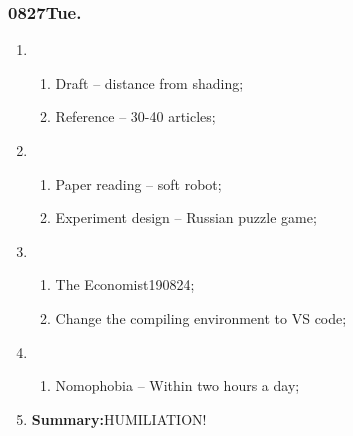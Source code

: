 \subsubsection{0827Tue.}
\begin{enumerate}
	\item \ncquaone
	\begin{enumerate}[(1)]
		\item Draft -- distance from shading;\rightundoneBlack
		\item Reference -- 30-40 articles;\rightundoneBlack
	\end{enumerate}
	
	\item \ncquatwo	
	\begin{enumerate}[(1)]
		\item Paper reading -- soft robot;\rightundoneBlack
		\item Experiment design -- Russian puzzle game;\rightundoneBlack
	\end{enumerate}
	
	\item \ncquathree
	\begin{enumerate}[(1)]
		\item The Economist190824;\rightundoneBlack
		\item Change the compiling environment to VS code;\rightdone
	\end{enumerate}
	
	\item \ncquafour	
	\begin{enumerate}[(1)]
		\item Nomophobia -- Within two hours a day;\rightundoneBlack
	\end{enumerate}
	\item \textbf{Summary:}HUMILIATION! 
\end{enumerate}
